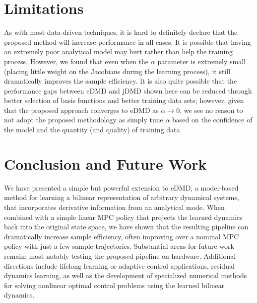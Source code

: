 \documentclass{article}
\begin{document}
      
      \section{Limitations} \label{sec:limitations}
      As with most data-driven techniques, it is hard to definitely declare that the proposed 
      method will increase performance in all cases. It is possible that having an extremely poor
      analytical model may hurt rather than help the training process. However, we found that even
      when the $\alpha$ parameter is extremely small (placing little weight on the Jacobians 
      during the learning process), it still dramatically improves the sample efficiency. It is 
      also quite possible that the performance gaps between eDMD and jDMD shown here can be 
      reduced through better selection of basis functions and better training data sets; however,
      given that the proposed approach converges to eDMD as $\alpha \rightarrow 0$, we see no 
      reason to not adopt the proposed methodology as simply tune $\alpha$ based on the 
      confidence of the model and the quantity (and quality) of training data.
      
      
      \section{Conclusion and Future Work} \label{sec:conclusion}
      We have presented a simple but powerful extension to eDMD, a model-based method for learning
      a bilinear representation of arbitrary dynamical systems, that incorporates derivative 
      information from an analytical mode. When combined with a simple linear
      MPC policy that projects the learned dynamics back into the original state space, we have 
      shown that the resulting pipeline can dramatically increase sample efficiency, often 
      improving over a nominal MPC policy with just a few sample trajectories. Substantial areas 
      for future work remain: most notably testing the proposed pipeline on hardware. Additional 
      directions include lifelong learning or adaptive control applications, residual dynamics 
      learning, as well as the development of specialized numerical methods for solving nonlinear 
      optimal control problems using the learned bilinear dynamics.
      
      
      
      
\end{document}
